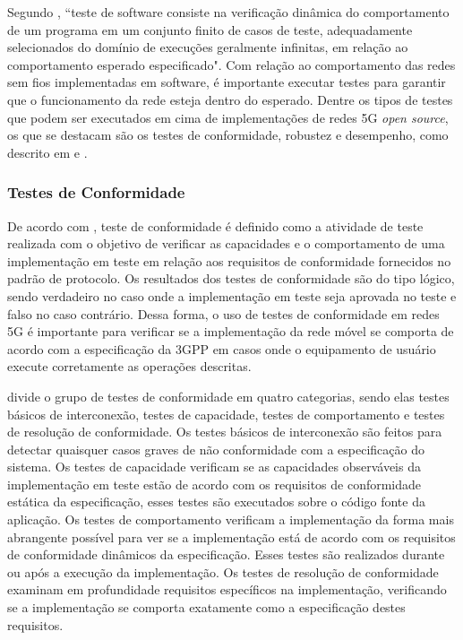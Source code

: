 Segundo \cite[p.~2, tradução nossa]{Bertolino2003}, ``teste de software consiste na verificação dinâmica do comportamento de um programa em um conjunto finito de casos de teste, adequadamente selecionados do domínio de execuções geralmente infinitas, em relação ao comportamento esperado especificado".
Com relação ao comportamento das redes sem fios implementadas em software, é importante executar testes para garantir que o funcionamento da rede esteja dentro do esperado.
Dentre os tipos de testes que podem ser executados em cima de implementações de redes 5G \textit{open source}, os que se destacam são os testes de conformidade, robustez e desempenho, como descrito em \cite{Dominato2021} e \cite{Zhang2019ASO}.

\subsubsection{Testes de Conformidade}

De acordo com \cite{Sarikaya1989}, teste de conformidade é definido como a atividade de teste realizada com o objetivo de verificar as capacidades e o comportamento de uma implementação em teste em relação aos requisitos de conformidade fornecidos no padrão de protocolo.
Os resultados dos testes de conformidade são do tipo lógico, sendo verdadeiro no caso onde a implementação em teste seja aprovada no teste e falso no caso contrário.
Dessa forma, o uso de testes de conformidade em redes 5G é importante para verificar se a implementação da rede móvel se comporta de acordo com a especificação da 3GPP em casos onde o equipamento de usuário execute corretamente as operações descritas.

\cite{Rayner1987} divide o grupo de testes de conformidade em quatro categorias, sendo elas testes básicos de interconexão, testes de capacidade, testes de comportamento e testes de resolução de conformidade.
Os testes básicos de interconexão são feitos para detectar quaisquer casos graves de não conformidade com a especificação do sistema.
Os testes de capacidade verificam se as capacidades observáveis da implementação em teste estão de acordo com os requisitos de conformidade estática da especificação, esses testes são executados sobre o código fonte da aplicação.
Os testes de comportamento verificam a implementação da forma mais abrangente possível para ver se a implementação está de acordo com os requisitos de conformidade dinâmicos da especificação. Esses testes são realizados durante ou após a execução da implementação.
Os testes de resolução de conformidade examinam em profundidade requisitos específicos na implementação, verificando se a implementação se comporta exatamente como a especificação destes requisitos.

